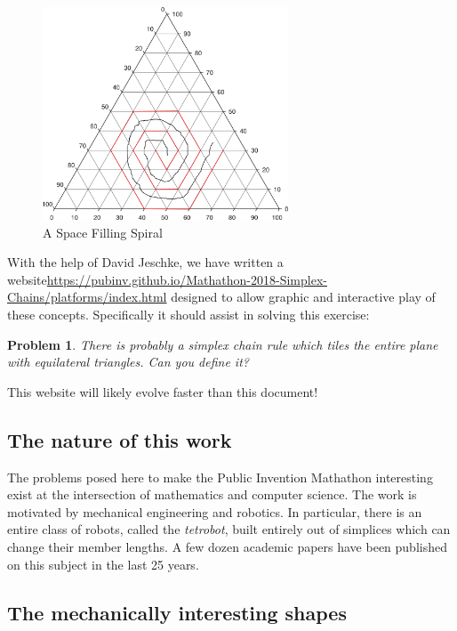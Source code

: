 \documentclass[11pt]{article}
\newtheorem{problem}{Problem}
\begin{document}
\begin{figure}
     \centering
     \includegraphics[width=0.65\textwidth]{figures/2DSpaceFilling.png}
     \caption{A Space Filling Spiral}
  \label{fig:equitetrabeam}
\end{figure}




With the help of David Jeschke, we have written a website\url{https://pubinv.github.io/Mathathon-2018-Simplex-Chains/platforms/index.html}
designed to allow graphic and interactive play of these concepts.  Specifically it should assist in solving this exercise:

\begin{problem}
  There is probably a simplex chain rule which tiles the entire plane with equilateral triangles. Can you define it?
\end{problem}

This website will likely evolve faster than this document!

\subsection{The nature of this work}

The problems posed here to make the Public Invention Mathathon interesting exist at the intersection of mathematics and
computer science. The work is motivated by mechanical engineering and robotics. In particular, there is an entire class
of robots, called the {\em tetrobot}, built entirely out of simplices which can change their member lengths. A few
dozen academic papers have been published on this subject in the last 25 years.

\subsection{The mechanically interesting shapes}
\end{document}
